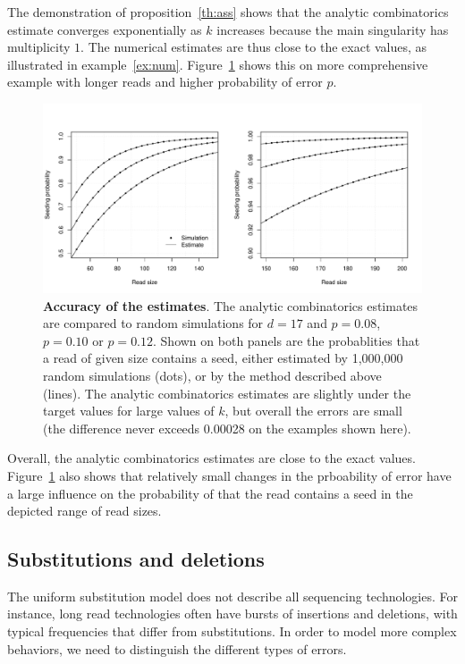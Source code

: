\documentclass{article}
\begin{document}
The demonstration of proposition~\ref{th:ass} shows that the analytic
combinatorics estimate converges exponentially as $k$ increases because
the main singularity has multiplicity $1$. The numerical estimates are
thus close to the exact values, as illustrated in example~\ref{ex:num}.
Figure~\ref{fig:simulp} shows this on more comprehensive example
with longer reads and higher probability of error $p$.

\begin{figure}[h]
\centering
\includegraphics[scale=0.445]{simulp.pdf}
\caption{\textbf{Accuracy of the estimates}. The analytic combinatorics
estimates are compared to random simulations for $d=17$ and $p=0.08$,
$p=0.10$ or $p=0.12$. Shown on both panels are the probablities that a
read of given size contains a seed, either estimated by 1,000,000 random
simulations (dots), or by the method described above (lines). The analytic
combinatorics estimates are slightly under the target values for large
values of $k$, but overall the errors are small (the difference never
exceeds 0.00028 on the examples shown here).}
\label{fig:simulp}
\end{figure}

Overall, the analytic combinatorics estimates are close to the exact
values. Figure~\ref{fig:simulp} also shows that relatively small changes
in the prboability of error have a large influence on the probability of
that the read contains a seed in the depicted range of read sizes.

\subsection{Substitutions and deletions}

The uniform substitution model does not describe all sequencing
technologies. For instance, long read technologies often have bursts of
insertions and deletions, with typical frequencies that differ from
substitutions. In order to model more complex behaviors, we need to
distinguish the different types of errors.
\end{document}
